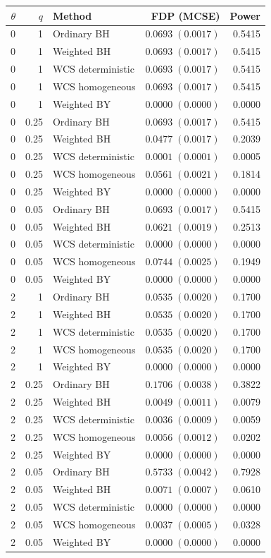 \begin{tabular}{rrlrr}\toprule
$\theta$ & $q$ & Method & FDP (MCSE) & Power\\\midrule
0 & 1 & Ordinary BH & $0.0693\;( 0.0017)$ & 0.5415 \\
0 & 1 & Weighted BH & $0.0693\;( 0.0017)$ & 0.5415 \\
0 & 1 & WCS deterministic & $0.0693\;( 0.0017)$ & 0.5415 \\
0 & 1 & WCS homogeneous & $0.0693\;( 0.0017)$ & 0.5415 \\
0 & 1 & Weighted BY & $0.0000\;( 0.0000)$ & 0.0000 \\
0 & 0.25 & Ordinary BH & $0.0693\;( 0.0017)$ & 0.5415 \\
0 & 0.25 & Weighted BH & $0.0477\;( 0.0017)$ & 0.2039 \\
0 & 0.25 & WCS deterministic & $0.0001\;( 0.0001)$ & 0.0005 \\
0 & 0.25 & WCS homogeneous & $0.0561\;( 0.0021)$ & 0.1814 \\
0 & 0.25 & Weighted BY & $0.0000\;( 0.0000)$ & 0.0000 \\
0 & 0.05 & Ordinary BH & $0.0693\;( 0.0017)$ & 0.5415 \\
0 & 0.05 & Weighted BH & $0.0621\;( 0.0019)$ & 0.2513 \\
0 & 0.05 & WCS deterministic & $0.0000\;( 0.0000)$ & 0.0000 \\
0 & 0.05 & WCS homogeneous & $0.0744\;( 0.0025)$ & 0.1949 \\
0 & 0.05 & Weighted BY & $0.0000\;( 0.0000)$ & 0.0000 \\
2 & 1 & Ordinary BH & $0.0535\;( 0.0020)$ & 0.1700 \\
2 & 1 & Weighted BH & $0.0535\;( 0.0020)$ & 0.1700 \\
2 & 1 & WCS deterministic & $0.0535\;( 0.0020)$ & 0.1700 \\
2 & 1 & WCS homogeneous & $0.0535\;( 0.0020)$ & 0.1700 \\
2 & 1 & Weighted BY & $0.0000\;( 0.0000)$ & 0.0000 \\
2 & 0.25 & Ordinary BH & $0.1706\;( 0.0038)$ & 0.3822 \\
2 & 0.25 & Weighted BH & $0.0049\;( 0.0011)$ & 0.0079 \\
2 & 0.25 & WCS deterministic & $0.0036\;( 0.0009)$ & 0.0059 \\
2 & 0.25 & WCS homogeneous & $0.0056\;( 0.0012)$ & 0.0202 \\
2 & 0.25 & Weighted BY & $0.0000\;( 0.0000)$ & 0.0000 \\
2 & 0.05 & Ordinary BH & $0.5733\;( 0.0042)$ & 0.7928 \\
2 & 0.05 & Weighted BH & $0.0071\;( 0.0007)$ & 0.0610 \\
2 & 0.05 & WCS deterministic & $0.0000\;( 0.0000)$ & 0.0000 \\
2 & 0.05 & WCS homogeneous & $0.0037\;( 0.0005)$ & 0.0328 \\
2 & 0.05 & Weighted BY & $0.0000\;( 0.0000)$ & 0.0000 \\
\bottomrule\end{tabular}
